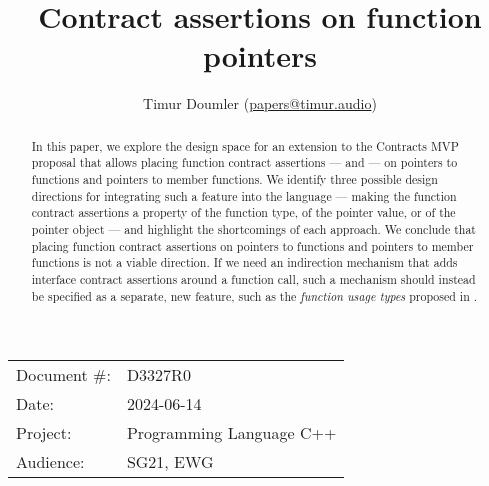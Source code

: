 

 \usepackage[bottom]{footmisc} 

 \usepackage{longtable}


\usepackage{tikz,lipsum,lmodern}
\usepackage[most]{tcolorbox}



\usepackage{titlesec}
\usepackage{tocloft}


\newcommand{\changelocaltocdepth}[1]{%
  \addtocontents{toc}{\protect\setcounter{tocdepth}{#1}}%
  \setcounter{tocdepth}{#1}%
}

\setcounter{tocdepth}{3}



\title{Contract assertions on function pointers}
\author{ Timur Doumler \small(\href{mailto:papers@timur.audio}{papers@timur.audio}) 
}
\date{}
\maketitle

\begin{tabular}{ll}
Document \#: & D3327R0 \\
Date: &2024-06-14 \\
Project: & Programming Language C++ \\
Audience: & SG21, EWG
\end{tabular}

\begin{abstract}
In this paper, we explore the design space for an extension to the Contracts MVP proposal \cite{P2900R7} that allows placing function contract assertions ---  and  --- on pointers to functions and pointers to member functions. We identify three possible design directions for integrating such a feature into the language --- making the function contract assertions a property of the function type, of the pointer value, or of the pointer object --- and highlight the shortcomings of each approach. We conclude that placing function contract assertions on pointers to functions and pointers to member functions is not a viable direction. If we need an indirection mechanism that adds interface contract assertions around a function call, such a mechanism should instead be specified as a separate, new feature, such as the \emph{function usage types} proposed in \cite{P3271R0}.
\end{abstract}

